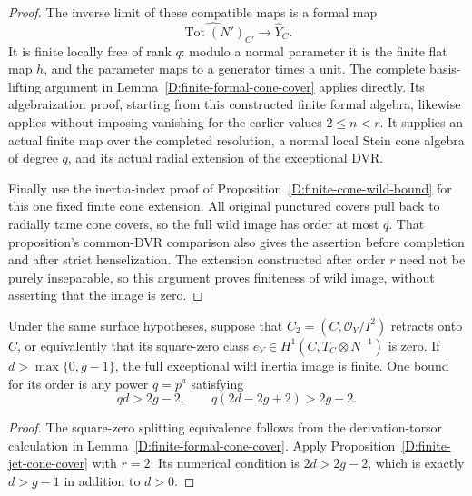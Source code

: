 \begin{proof}
The inverse limit of these compatible maps is a formal
map
\[
       \widehat{\operatorname{Tot}(N')}_{C'}
                     \longrightarrow\widehat Y_C.
\]
It is finite locally free of rank $q$: modulo a normal
parameter it is the finite flat map $h$, and the
parameter maps to a generator times a unit.  The
complete basis-lifting argument in
Lemma~\ref{D:finite-formal-cone-cover} applies directly.
Its algebraization proof, starting from this constructed
finite formal algebra, likewise applies without imposing
vanishing for the earlier values $2\leq n<r$.
It supplies an actual finite map over the completed
resolution, a normal local Stein cone algebra of
degree $q$, and its actual radial extension of the
exceptional DVR.

Finally use the inertia-index proof of
Proposition~\ref{D:finite-cone-wild-bound} for this one
fixed finite cone extension.  All original punctured
covers pull back to radially tame cone covers, so the
full wild image has order at most $q$.
That proposition's common-DVR comparison also gives
the assertion before completion and after strict
henselization.  The extension constructed after
order $r$ need not be purely inseparable, so this
argument proves finiteness of wild image, without
asserting that the image is zero.
\end{proof}

\begin{corollary}
\label{D:split-first-neighborhood-finite-wild}
Under the same surface hypotheses, suppose that
$C_2=(C,\mathcal O_Y/I^2)$ retracts onto $C$, or
equivalently that its square-zero class
$e_Y\in H^1(C,T_C\otimes N^{-1})$ is zero.
If $d>\max\{0,g-1\}$, the full exceptional wild
inertia image is finite.
One bound for its order is any power $q=p^a$ satisfying
\[
             qd>2g-2,\qquad q(2d-2g+2)>2g-2.
\]
\end{corollary}

\begin{proof}
The square-zero splitting equivalence follows from
the derivation-torsor calculation in
Lemma~\ref{D:finite-formal-cone-cover}.
Apply Proposition~\ref{D:finite-jet-cone-cover} with
$r=2$.  Its numerical condition is $2d>2g-2$,
which is exactly $d>g-1$ in addition to $d>0$.
\end{proof}

